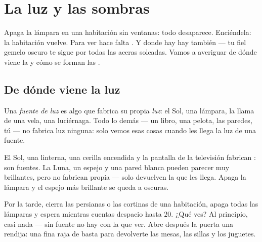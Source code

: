 \chapter{La luz y las sombras}\label{ch:g1:light-and-shadows}

Apaga la lámpara en una habitación sin ventanas: todo desaparece.
Enciéndela: la habitación vuelve. Para ver hace falta . Y donde hay
 hay también  --- tu fiel gemelo oscuro te sigue por
todas las aceras soleadas. Vamos a averiguar de dónde viene la  y
cómo se forman las .

\section{De dónde viene la luz}

\begin{definition}\label{def:g1:light-and-shadows:source}
Una \emph{fuente de luz} es algo que fabrica su
propia \emph{luz}: el Sol, una lámpara, la llama de una
vela, una luciérnaga. Todo lo demás --- un libro, una pelota, las
paredes, tú --- no fabrica luz ninguna: solo vemos esas cosas cuando
les llega la luz de una fuente.
\end{definition}

\begin{example}[¿Fuentes o no?]\label{ex:g1:light-and-shadows:sources}
El Sol, una linterna, una cerilla encendida y la pantalla de la
televisión fabrican : son fuentes. La Luna, un espejo y una
pared blanca pueden parecer muy brillantes, pero no fabrican 
propia --- solo devuelven la  que les llega. Apaga la lámpara y
el espejo más brillante se queda a oscuras.
\end{example}

\begin{example}\label{ex:g1:light-and-shadows:darkroom}
Por la tarde, cierra las persianas o las cortinas de una habitación,
apaga todas las lámparas y espera mientras cuentas despacio hasta
$20$. ¿Qué ves? Al principio, casi nada --- sin fuente no hay  con
la que ver. Abre después la puerta una rendija: una fina raja de 
basta para devolverte las mesas, las sillas y los juguetes.
\end{example}

